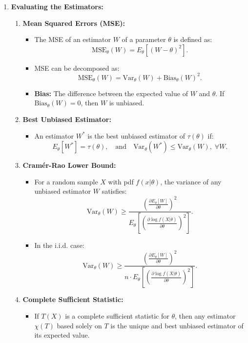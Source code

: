\documentclass{article}
\begin{document}
\begin{enumerate}
    \item \textbf{Evaluating the Estimators:}
    \begin{enumerate}
        \item \textbf{Mean Squared Errors (MSE):}
        \begin{itemize}
            \item The MSE of an estimator \(W\) of a parameter \(\theta\) is defined as:
            \[
            \text{MSE}_\theta(W) = E_\theta[(W - \theta)^2].
            \]
            \item MSE can be decomposed as:
            \[
            \text{MSE}_\theta(W) = \text{Var}_\theta(W) + \text{Bias}_\theta(W)^2.
            \]
            \item \textbf{Bias:} The difference between the expected value of \(W\) and \(\theta\). If \(\text{Bias}_\theta(W) = 0\), then \(W\) is unbiased.
        \end{itemize}
        \item \textbf{Best Unbiased Estimator:}
        \begin{itemize}
            \item An estimator \(W^*\) is the best unbiased estimator of \(\tau(\theta)\) if:
            \[
            E_\theta[W^*] = \tau(\theta), \quad \text{and} \quad \text{Var}_\theta(W^*) \leq \text{Var}_\theta(W), \; \forall W.
            \]
        \end{itemize}
        \item \textbf{Cramér-Rao Lower Bound:}
        \begin{itemize}
            \item For a random sample \(X\) with pdf \(f(x|\theta)\), the variance of any unbiased estimator \(W\) satisfies:
            \[
            \text{Var}_\theta(W) \geq \frac{\left( \frac{\partial E_\theta[W]}{\partial \theta} \right)^2}{E_\theta\left[\left( \frac{\partial \log f(X|\theta)}{\partial \theta} \right)^2\right]}.
            \]
            \item In the i.i.d. case:
            \[
            \text{Var}_\theta(W) \geq \frac{\left( \frac{\partial E_\theta[W]}{\partial \theta} \right)^2}{n \cdot E_\theta\left[\left( \frac{\partial \log f(X|\theta)}{\partial \theta} \right)^2\right]}.
            \]
        \end{itemize}
        \item \textbf{Complete Sufficient Statistic:}
        \begin{itemize}
            \item If \(T(X)\) is a complete sufficient statistic for \(\theta\), then any estimator \(\chi(T)\) based solely on \(T\) is the unique and best unbiased estimator of its expected value.
        \end{itemize}
    \end{enumerate}
\end{enumerate}
\end{document}
